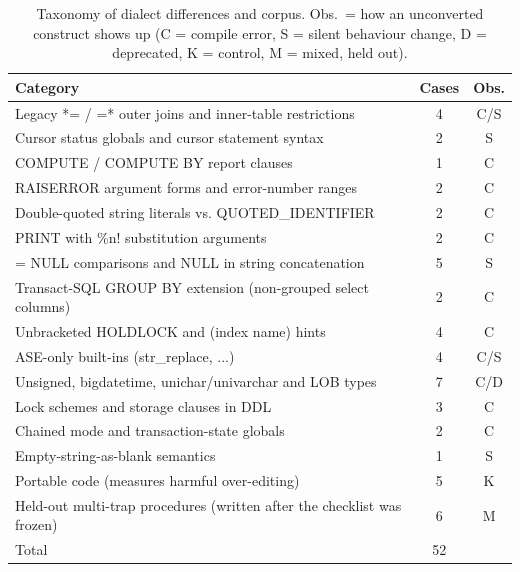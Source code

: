 \begin{table}[t]
\centering
\caption{Taxonomy of dialect differences and corpus. Obs.\ = how an unconverted construct shows up (C = compile error, S = silent behaviour change, D = deprecated, K = control, M = mixed, held out).}
\label{tab:taxonomy}
\footnotesize
\begin{tabular}{>{\raggedright\arraybackslash}p{}cc}
\toprule
Category & Cases & Obs. \\
\midrule
Legacy *= / =* outer joins and inner-table restrictions & 4 & C/S \\
Cursor status globals and cursor statement syntax & 2 & S \\
COMPUTE / COMPUTE BY report clauses & 1 & C \\
RAISERROR argument forms and error-number ranges & 2 & C \\
Double-quoted string literals vs. QUOTED\_IDENTIFIER & 2 & C \\
PRINT with \%n! substitution arguments & 2 & C \\
= NULL comparisons and NULL in string concatenation & 5 & S \\
Transact-SQL GROUP BY extension (non-grouped select columns) & 2 & C \\
Unbracketed HOLDLOCK and (index name) hints & 4 & C \\
ASE-only built-ins (str\_replace, ...) & 4 & C/S \\
Unsigned, bigdatetime, unichar/univarchar and LOB types & 7 & C/D \\
Lock schemes and storage clauses in DDL & 3 & C \\
Chained mode and transaction-state globals & 2 & C \\
Empty-string-as-blank semantics & 1 & S \\
Portable code (measures harmful over-editing) & 5 & K \\
Held-out multi-trap procedures (written after the checklist was frozen) & 6 & M \\
\midrule
Total & 52 & \\
\bottomrule
\end{tabular}
\end{table}
